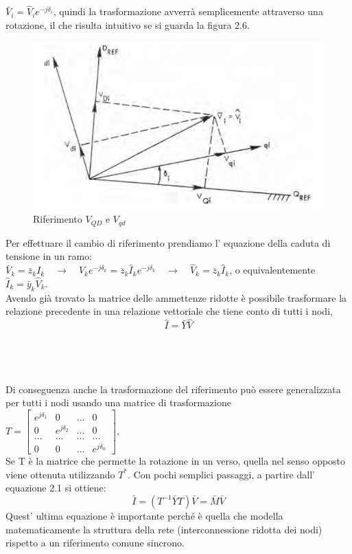 \documentclass[Lau,noexaminfo]{sapthesis}
\begin{document}
	$\bar{V}_i=\hat{V}_ie^{-j\delta_i}$, quindi la trasformazione avverrà semplicemente attraverso una rotazione, il che risulta intuitivo se si guarda la figura 2.6.
	\begin{figure}
		\centering
		\includegraphics[height=0.3\textheight]{cambio_coordinate}
		\caption{Riferimento $V_{QD}$ e $V_{qd}$}
	\end{figure}
	Per effettuare il cambio di riferimento prendiamo l' equazione della caduta di tensione in un ramo:\\
	$\bar{V}_k=\bar{z}_kI_k \quad \rightarrow \quad \hat{V}_ke^{-j\delta_k}=\bar{z}_k\hat{I}_ke^{-j\delta_k} \quad \rightarrow \quad \hat{V}_k=\bar{z}_k\hat{I}_k$, o equivalentemente $\hat{I}_k=\bar{y}_k\hat{V}_k$.\\
	Avendo già trovato la matrice delle ammettenze ridotte è possibile trasformare la relazione precedente in una relazione vettoriale che tiene conto di tutti i nodi,
	\begin{equation}
		\hat{I}=\bar{Y}\hat{V}
	\end{equation}
	\\\\\\\\
	Di conseguenza anche la trasformazione del riferimento può essere generalizzata per tutti i nodi usando una matrice di trasformazione\\
	$T=\begin{bmatrix}
	e^{j\delta_1} & 0 & ... & 0\\
	0 & e^{j\delta_2} & ... & 0\\
	... & ...  & ... & ...\\
	0 & 0 & ... & e^{j\delta_n}
	\end{bmatrix}$,\\
	Se T è la matrice che permette la rotazione in un verso, quella nel senso opposto viene ottenuta utilizzando $T^*$. Con pochi semplici passaggi, a partire dall' equazione 2.1 si ottiene:\\
	\begin{equation}
	\bar{I}=(T^{-1}\bar{Y}T)\bar{V}=\bar{M}\bar{V}
	\end{equation}
	Quest' ultima equazione è importante perché è quella che modella matematicamente la struttura della rete (interconnessione ridotta dei nodi) rispetto a un riferimento comune sincrono.
	
\end{document}

